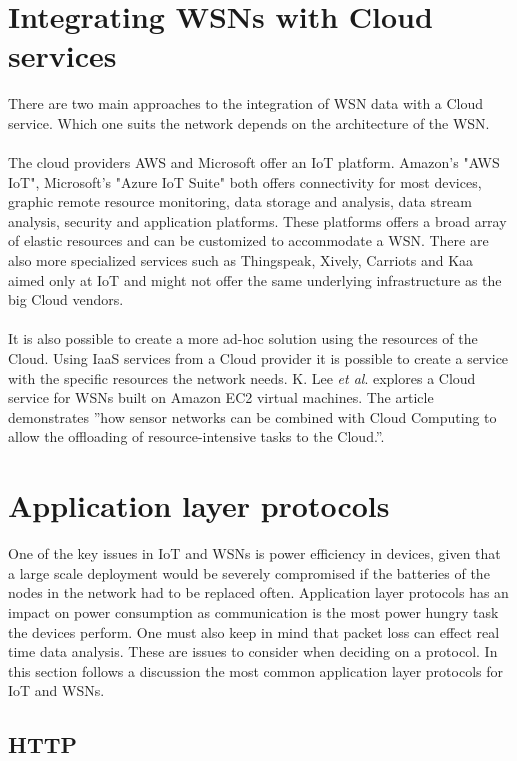 \documentclass[]{uiophd}
\begin{document}
\section{Integrating WSNs with Cloud services}
There are two main approaches to the integration of WSN data with a Cloud service. Which one suits the network depends on the architecture of the WSN.
\\\\
The cloud providers AWS and Microsoft offer an IoT platform. Amazon's "AWS IoT", Microsoft's "Azure IoT Suite" both offers connectivity for most devices, graphic remote resource monitoring, data storage and analysis, data stream analysis, security and application platforms. These platforms offers a broad array of elastic resources and can be customized to accommodate a WSN. There are also more specialized services such as Thingspeak, Xively, Carriots and Kaa aimed only at IoT and might not offer the same underlying infrastructure as the big Cloud vendors.
\\\\
It is also possible to create a more ad-hoc solution using the resources of the Cloud. Using IaaS services from a Cloud provider it is possible to create a service with the specific resources the network needs. K. Lee \textit{et al}. \cite{5678063} explores a Cloud service for WSNs built on Amazon EC2 virtual machines. The article demonstrates ''how sensor networks can be combined with Cloud Computing to allow the offloading of resource-intensive tasks to the Cloud.''\cite{56780637}.

\section{Application layer protocols}
One of the key issues in IoT and WSNs is power efficiency in devices, given that a large scale deployment would be severely compromised if the batteries of the nodes in the network had to be replaced often. Application layer protocols has an impact on power consumption as communication is the most power hungry task the devices perform. One must also keep in mind that packet loss can effect real time data analysis. These are issues to consider when deciding on a protocol. In this section follows a discussion the most common application layer protocols for IoT and WSNs.

\subsection{HTTP}
 
\end{document}
